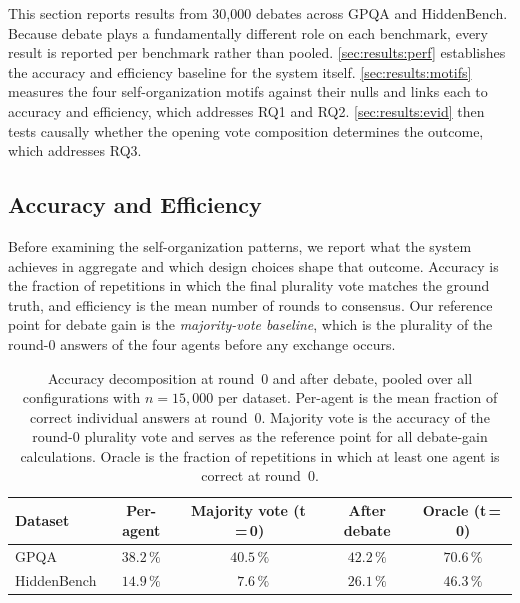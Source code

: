 This section reports results from 30{,}000 debates across GPQA and HiddenBench.
Because debate plays a fundamentally different role on each benchmark, every result
is reported per benchmark rather than pooled.
\autoref{sec:results:perf} establishes the accuracy and efficiency baseline for the system itself.
\autoref{sec:results:motifs} measures the four self-organization motifs against their
nulls and links each to accuracy and efficiency, which addresses RQ1 and RQ2.
\autoref{sec:results:evid} then tests causally whether the opening vote composition
determines the outcome, which addresses RQ3.

\subsection{Accuracy and Efficiency}
\label{sec:results:perf}

Before examining the self-organization patterns, we report what the system
achieves in aggregate and which design choices shape that outcome.
Accuracy is the fraction of repetitions in which the final plurality vote matches
the ground truth, and efficiency is the mean number of rounds to consensus.
Our reference point for debate gain is the \emph{majority-vote baseline},
which is the plurality of the round-0 answers of the four agents before any exchange occurs.

\begin{table}[H]
\centering
\small
\begin{tabular}{lcccc}
\toprule
Dataset & Per-agent & Majority vote (t\,=\,0) & After debate & Oracle (t\,=\,0) \\
\midrule
GPQA        & $38.2\,\%$ & $40.5\,\%$ & $\mathbf{42.2\,\%}$ & $70.6\,\%$ \\
HiddenBench & $14.9\,\%$ & $\phantom{0}7.6\,\%$ & $\mathbf{26.1\,\%}$ & $46.3\,\%$ \\
\bottomrule
\end{tabular}
\caption[Baseline and debate accuracy by dataset]{Accuracy decomposition at round~0
         and after debate, pooled over all configurations with $n = 15{,}000$ per
         dataset. Per-agent is the mean fraction of correct individual answers at
         round~0. Majority vote is the accuracy of the round-0 plurality vote and
         serves as the reference point for all debate-gain calculations. Oracle is
         the fraction of repetitions in which at least one agent is correct at
         round~0.}
\label{tab:perf:baseline}
\end{table}

